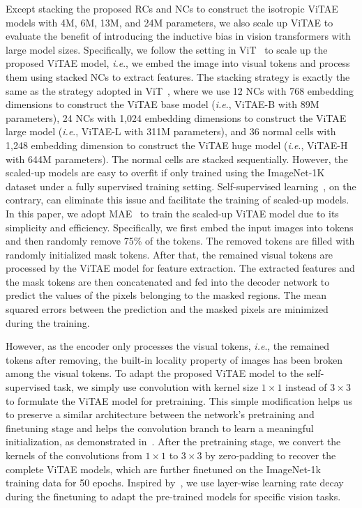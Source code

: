 \documentclass[twocolumn]{svjour3}          \smartqed  \usepackage{natbib}
\newcommand{\ie}{i.e}
\def\onedot{.\xspace}
\def\ie{\emph{i.e}\onedot}
\begin{document}
Except stacking the proposed RCs and NCs to construct the isotropic ViTAE models with 4M, 6M, 13M, and 24M parameters, we also scale up ViTAE to evaluate the benefit of introducing the inductive bias in vision transformers with large model sizes. Specifically, we follow the setting in ViT~\citep{dosovitskiy2020image} to scale up the proposed ViTAE model, \ie, we embed the image into visual tokens and process them using stacked NCs to extract features. The stacking strategy is exactly the same as the strategy adopted in ViT~\citep{dosovitskiy2020image}, where we use 12 NCs with 768 embedding dimensions to construct the ViTAE base model (\ie, ViTAE-B with 89M parameters), 24 NCs with 1,024 embedding dimensions to construct the ViTAE large model (\ie, ViTAE-L with 311M parameters), and 36 normal cells with 1,248 embedding dimension to construct the ViTAE huge model (\ie, ViTAE-H with 644M parameters). The normal cells are stacked sequentially. However, the scaled-up models are easy to overfit if only trained using the ImageNet-1K dataset under a fully supervised training setting. Self-supervised learning~\citep{he2021masked}, on the contrary, can eliminate this issue and facilitate the training of scaled-up models. In this paper, we adopt MAE~\citep{he2021masked} to train the scaled-up ViTAE model due to its simplicity and efficiency. Specifically, we first embed the input images into tokens and then randomly remove 75\% of the tokens. The removed tokens are filled with randomly initialized mask tokens. After that, the remained visual tokens are processed by the ViTAE model for feature extraction. The extracted features and the mask tokens are then concatenated and fed into the decoder network to predict the values of the pixels belonging to the masked regions. The mean squared errors between the prediction and the masked pixels are minimized during the training. 

However, as the encoder only processes the visual tokens, \ie, the remained tokens after removing, the built-in locality property of images has been broken among the visual tokens. To adapt the proposed ViTAE model to the self-supervised task, we simply use convolution with kernel size $1 \times 1$ instead of $3 \times 3$ to formulate the ViTAE model for pretraining. This simple modification helps us to preserve a similar architecture between the network's pretraining and finetuning stage and helps the convolution branch to learn a meaningful initialization, as demonstrated in~\citep{zhang2018fully}. After the pretraining stage, we convert the kernels of the convolutions from $1\times 1$ to $3 \times 3$ by zero-padding to recover the complete ViTAE models, which are further finetuned on the ImageNet-1k training data for 50 epochs. Inspired by~\citep{beit}, we use layer-wise learning rate decay during the finetuning to adapt the pre-trained models for specific vision tasks.  
\end{document}
